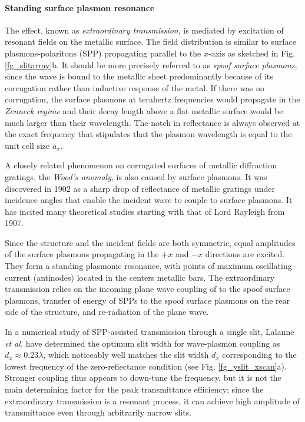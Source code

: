 \paragraph{Standing surface plasmon resonance} %
The effect, known as \textit{extraordinary transmission}, is mediated by excitation of resonant fields on the metallic surface. 
The field distribution is similar to surface plasmons-polaritons (SPP) propagating parallel to the $x$-axis as sketched in Fig. \ref{fg_slitarray}b. It should be more precisely referred to as \textit{spoof surface plasmons}, since the wave is bound to the metallic sheet predominantly because of its corrugation rather than inductive response of the metal. If there was no corrugation, the surface plasmons at terahertz frequencies would propagate in the \textit{Zenneck regime} \cite{navarro-cia2013terahertz} and their decay length above a flat metallic surface would be much larger than their wavelength. 
The notch in reflectance is always observed at the exact frequency that stipulates that the plasmon wavelength is equal to the unit cell size $a_x$.

A closely related phenomenon  on corrugated surfaces of metallic diffraction gratings, the \textit{Wood's anomaly}, is also caused by surface plasmons. It was discovered in 1902 as a sharp drop of reflectance of metallic gratings \cite{wood1902remarkable} under incidence angles that enable the incident wave to couple to surface plasmons. It has incited many theoretical studies starting with that of Lord Rayleigh \cite{rayleigh1907dynamical} from 1907.  %

Since the structure and the incident fields are both symmetric, equal amplitudes of the surface plasmons propagating in the $+x$ and $-x$ directions are excited. They form a standing plasmonic resonance, with points of maximum oscillating current (antinodes) located in the centers metallic bars. The extraordinary transmission relies on the incoming plane wave coupling of to the spoof surface plasmons, transfer of energy of SPPs to the spoof surface plasmons on the rear side of the structure, and re-radiation of the plane wave. 

In a numerical study of SPP-assisted transmission through a single slit, Lalanne \textit{et al.} have determined \cite{lalanne2005theory} the optimum slit width for wave-plasmon coupling as $d_x \approx 0.23 \lambda$, which noticeably well matches the slit width $d_x$ corresponding to the lowest frequency of the zero-reflectance condition  (see Fig. \ref{fg_yslit_xscan}a). Stronger coupling thus appears to down-tune the frequency, but it is not the main determining factor for the peak transmittance efficiency; since the extraordinary transmission is a resonant process, it can achieve high amplitude of transmittance even through arbitrarily narrow slits. 


